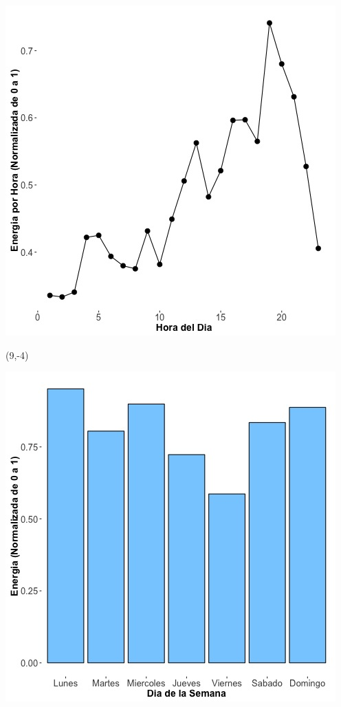 \documentclass{article}\usepackage[]{graphicx}\usepackage[]{color}
\newenvironment{knitrout}{}{} %
\begin{document}
\begin{knitrout}
\color{fgcolor}
\includegraphics[scale=0.65]{figure/A17_plot_norm_median} 
\end{knitrout}


 \begin{textblock}{1}(9,-4)
\begin{minipage}{20em}
\begingroup

\endgroup
\end{minipage}
\end{textblock}


\begin{knitrout}
\color{fgcolor}
\includegraphics[scale=0.65]{figure/A17_day_of_week_plot} 
\end{knitrout}
\end{document}
